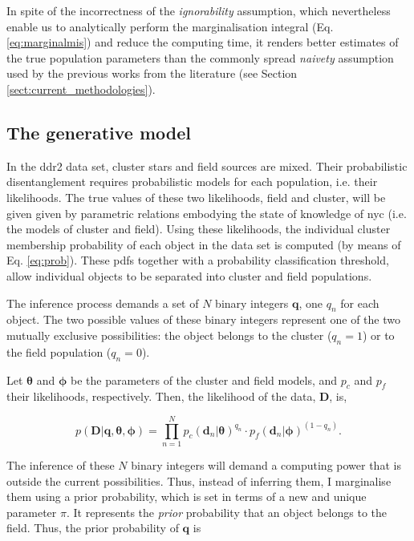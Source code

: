 In spite of the incorrectness of the \emph{ignorability} assumption, which nevertheless enable us to analytically perform the marginalisation integral (Eq. \ref{eq:marginalmis}) and reduce the computing time, it renders better estimates of the true population parameters than the commonly spread \emph{naivety} assumption used by the previous works from the literature (see Section \ref{sect:current_methodologies}). 

\subsection{The generative model}
\label{sect:generative-model}
In the \gls{ddr2} data set, cluster stars and field sources are mixed. Their probabilistic disentanglement requires probabilistic models for each population, i.e. their likelihoods. The true values of these two likelihoods, field and cluster, will be given given by parametric relations embodying the state of knowledge of \gls{nyc} (i.e. the models of cluster and field).  Using these likelihoods, the individual cluster membership probability of each object in the data set is computed (by means of Eq. \ref{eq:prob}). These \glspl{pdf}  together with a probability classification threshold, allow individual objects to be separated into cluster and field populations.

The inference process demands a set of $N$ binary integers $\mathbf{q}$, one $q_n$ for each object. The two possible values of these binary integers represent one of the two mutually exclusive possibilities: the object belongs to the cluster ($q_n=1$) or to the field population ($q_n=0$). 

Let $\boldsymbol{\theta}$ and $\boldsymbol{\phi}$ be the parameters of the cluster and field models, and $p_c$ and $p_f$ their likelihoods, respectively. Then, the likelihood of the data, $\mathbf{D}$, is,

\begin{equation}
p(\mathbf{D}|\mathbf{q},\boldsymbol{\theta},\boldsymbol{\phi})= \prod_{n=1}^N {p_c(\mathbf{d}_n|\boldsymbol{\theta})}^{q_n}\cdot {p_f(\mathbf{d}_n|\boldsymbol{\phi})}^{(1-q_n)}.
\end{equation}

The inference of these $N$ binary integers will demand a computing power that is outside the current possibilities. Thus, instead of inferring them, I marginalise them using a prior probability, which is set in terms of a new and unique parameter $\pi$. It represents the \emph{prior} probability that an object belongs to the field. Thus, the prior probability of $\mathbf{q}$ is

